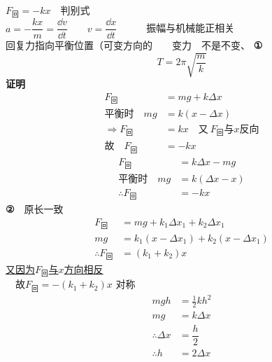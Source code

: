 \quad $F_{\text{回}}=-kx$　判别式\\[0.8ex]
$a=-\dfrac{kx}{m}=\dfrac{\dd v}{\dd t}$　　$v=\dfrac{\dd x}{\dd t}$　　　振幅与机械能正相关\\[0.8ex]
回复力指向平衡位置（可变方向的　　变力　不是不变、
\textbf{①}
\[
T=2\pi\sqrt{\dfrac{m}{k}}
\]
\textbf{证明}
\begin{align*}
F_{\text{回}}&=mg+k\Delta x\\
\text{平衡时}\quad mg&=k(x-\Delta x)\\
\Rightarrow F_{\text{回}}&=kx\quad\text{又}\ F_{\text{回}}\text{与}x\text{反向}\\
\text{故}\quad F_{\text{回}}&=-kx
\end{align*}
\begin{align*}
F_{\text{回}}&=k\Delta x-mg\\
\text{平衡时}\quad mg&=k(\Delta x-x)\\
\therefore F_{\text{回}}&=-kx
\end{align*}
\textbf{②}　原长一致
\begin{align*}
F_{\text{回}}&=mg+k_1\Delta x_1+k_2\Delta x_1\\
mg&=k_1(x-\Delta x_1)+k_2(x-\Delta x_1)\\
\therefore F_{\text{回}}&=(k_1+k_2)x
\end{align*}
\underline{又因为$F_{\text{回}}$与$x$方向相反}\\
　故$F_{\text{回}}=-(k_1+k_2)x$
对称　\ \ 
\begin{align*}
mgh&=\tfrac{1}{2}kh^2\\
mg&=k\Delta x\\
\therefore\Delta x&=\dfrac{h}{2}\\
\therefore h&=2\Delta x
\end{align*}
